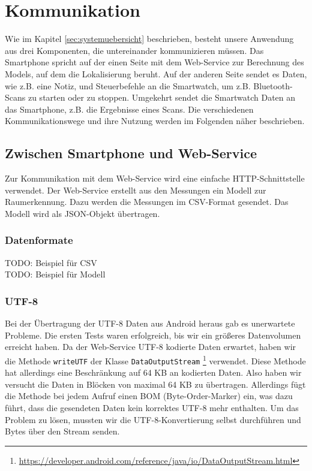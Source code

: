 \section{Kommunikation}
Wie im Kapitel \ref{sec:systemuebersicht} beschrieben, besteht unsere Anwendung aus drei Komponenten, die untereinander kommunizieren müssen. Das Smartphone spricht auf der einen Seite mit dem Web-Service zur Berechnung des Models, auf dem die Lokalisierung beruht. Auf der anderen Seite sendet es Daten, wie z.B. eine Notiz, und Steuerbefehle an die Smartwatch, um z.B. Bluetooth-Scans zu starten oder zu stoppen. Umgekehrt sendet die Smartwatch Daten an das Smartphone, z.B. die Ergebnisse eines Scans. Die verschiedenen Kommunikationswege und ihre Nutzung werden im Folgenden näher beschrieben.

\subsection{Zwischen Smartphone und Web-Service}

Zur Kommunikation mit dem Web-Service wird eine einfache HTTP-Schnittstelle verwendet.
Der Web-Service erstellt aus den Messungen ein Modell zur Raumerkennung. Dazu
werden die Messungen im CSV-Format gesendet. Das Modell wird als JSON-Objekt
übertragen.

\subsubsection{Datenformate}
TODO: Beispiel für CSV \\
TODO: Beispiel für Modell


\subsubsection{UTF-8}
Bei der Übertragung der UTF-8 Daten aus Android heraus gab es unerwartete Probleme.
Die ersten Tests waren erfolgreich, bis wir ein größeres Datenvolumen erreicht haben.
Da der Web-Service UTF-8 kodierte Daten erwartet, haben wir die Methode \texttt{writeUTF}
der Klasse \texttt{DataOutputStream}
\footnote{\url{https://developer.android.com/reference/java/io/DataOutputStream.html}} 
verwendet. Diese Methode hat allerdings eine Beschränkung auf 64 KB an kodierten Daten.
Also haben wir versucht die Daten in Blöcken von maximal 64 KB zu übertragen. Allerdings
fügt die Methode bei jedem Aufruf einen BOM (Byte-Order-Marker) ein, was dazu führt,
dass die gesendeten Daten kein korrektes UTF-8 mehr enthalten.
Um das Problem zu lösen, mussten wir die UTF-8-Konvertierung selbst durchführen
und Bytes über den Stream senden.

